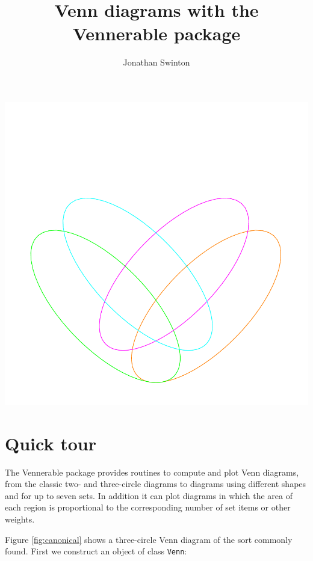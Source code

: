 \documentclass[a4paper]{article}
\title{
Venn diagrams with the Vennerable package
}
\author{Jonathan Swinton}
\begin{document}
\maketitle

\begin{center}
\includegraphics{Vennfig-002}
\end{center}

\newpage
\section{Quick tour}
The Vennerable package provides routines to compute and plot
Venn diagrams, from the classic two- and three-circle diagrams
to diagrams using different shapes and
for up to seven sets. In addition it can plot diagrams in which the
area of each region is proportional to the corresponding number of set items or 
other weights.

Figure \ref{fig:canonical} shows a three-circle Venn diagram of the sort
commonly found. First we construct an object of class \texttt{Venn}:
\end{document}
